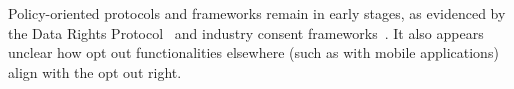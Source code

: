 Policy-oriented protocols and frameworks remain in early stages, as evidenced by the Data Rights Protocol~\cite{consumerreportsDataRightsProtocol2024} and industry consent frameworks~\cite{iabtechlabGlobalPrivacyPlatform2024}. It also appears unclear how opt out functionalities elsewhere (such as with mobile applications) align with the opt out right.
